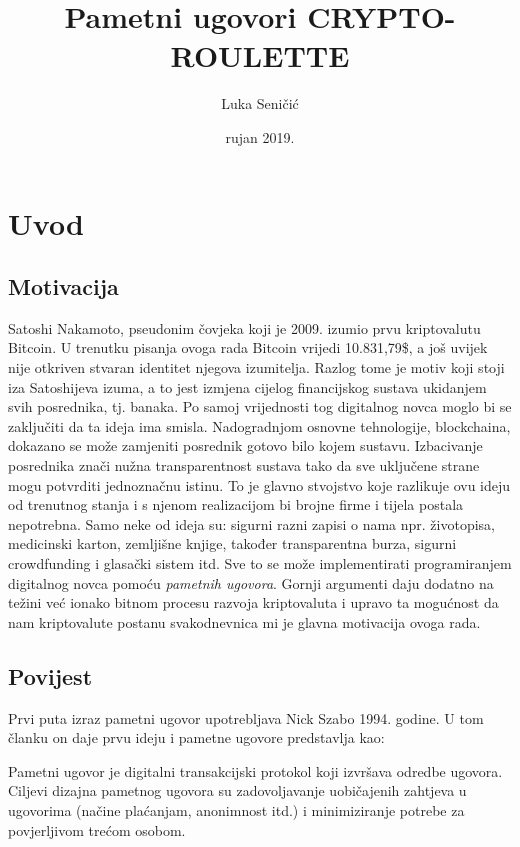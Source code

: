 \documentclass[a4paper,oneside,12pt]{memoir} %
\title{Pametni ugovori  CRYPTO-ROULETTE}
\author{Luka Seničić}
\date{rujan 2019.}  %
\begin{document}
\frontmatter


\chapter{Uvod}
\section{Motivacija}

Satoshi Nakamoto, pseudonim čovjeka koji je 2009. izumio prvu kriptovalutu Bitcoin. U trenutku pisanja ovoga rada Bitcoin vrijedi 10.831,79\$, a još uvijek nije otkriven stvaran identitet njegova izumitelja. Razlog tome je motiv koji stoji iza Satoshijeva izuma, a to jest izmjena cijelog financijskog sustava ukidanjem svih posrednika, tj. banaka. Po samoj vrijednosti tog digitalnog novca moglo bi se zaključiti da ta ideja ima smisla. Nadogradnjom osnovne tehnologije, blockchaina, dokazano se može zamjeniti posrednik gotovo bilo kojem sustavu. Izbacivanje posrednika znači nužna transparentnost sustava tako da sve uključene strane mogu potvrditi jednoznačnu istinu. To je glavno stvojstvo koje razlikuje ovu ideju od trenutnog stanja i s njenom realizacijom bi brojne firme i tijela postala nepotrebna. Samo neke od ideja su: sigurni razni zapisi o nama npr. životopisa, medicinski karton, zemljišne knjige, također transparentna burza, sigurni crowdfunding i glasački sistem itd. Sve to se može implementirati programiranjem digitalnog novca pomoću \emph{pametnih ugovora}. Gornji argumenti daju dodatno na težini već ionako bitnom procesu razvoja kriptovaluta i upravo ta mogućnost da nam kriptovalute postanu svakodnevnica mi je glavna motivacija ovoga rada. 

\section{Povijest}

Prvi puta izraz pametni ugovor upotrebljava Nick Szabo 1994. godine\cite{smart_contract_idea}. U tom članku on daje prvu ideju i pametne ugovore predstavlja kao:

\begin{definicija}
Pametni ugovor je digitalni transakcijski protokol koji izvršava odredbe ugovora. Ciljevi dizajna pametnog ugovora su zadovoljavanje uobičajenih zahtjeva u ugovorima (načine plaćanjam, anonimnost itd.) i minimiziranje potrebe za povjerljivom trećom osobom.
\end{definicija}
\end{document}
